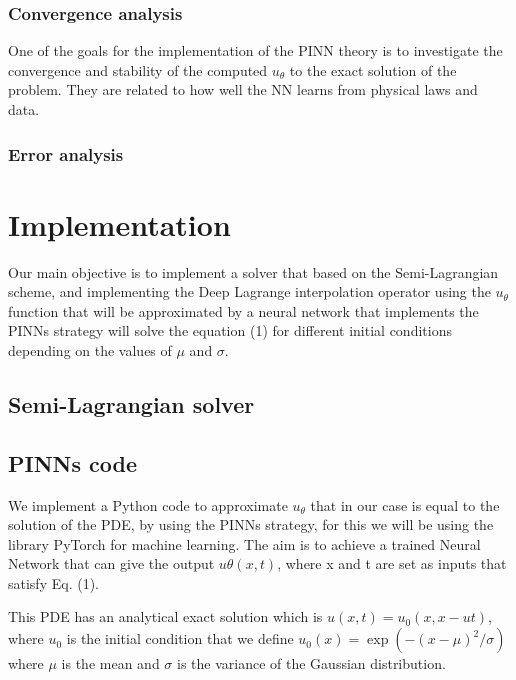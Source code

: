\documentclass{article}
\begin{document}

\subsubsection{Convergence analysis}
One of the goals for the implementation of the PINN theory is to investigate the convergence and stability of the computed $u_\theta$ to the exact solution of the problem. They are related to how well the NN learns from physical laws and data.

\subsubsection{Error analysis}

\section{Implementation}
Our main objective is to implement a solver that based on the Semi-Lagrangian scheme, and implementing the Deep Lagrange interpolation operator 
using the $u_\theta$ function that will be approximated by a neural network that implements the PINNs strategy will solve the equation (1) for different initial conditions depending on the values of $\mu$ and $\sigma$.

\subsection{Semi-Lagrangian solver}


\subsection{PINNs code}

We implement a Python code to approximate  $u_\theta$ that in our case is equal to the solution of the PDE, by using the PINNs strategy, for this we will be using the library PyTorch for machine learning.
The aim is to achieve a trained Neural Network that can give the output $u\theta(x, t)$, where x and t are set as inputs that satisfy Eq. (1). 

This PDE has an analytical exact solution which is $u(x,t) = u_0(x,x-ut)$, where $u_0$ is the initial condition that we define $u_0(x) = \exp(-(x-\mu)^2/\sigma)$ where $\mu$ is the mean and $\sigma$ is the variance of the Gaussian distribution. 
\end{document}
